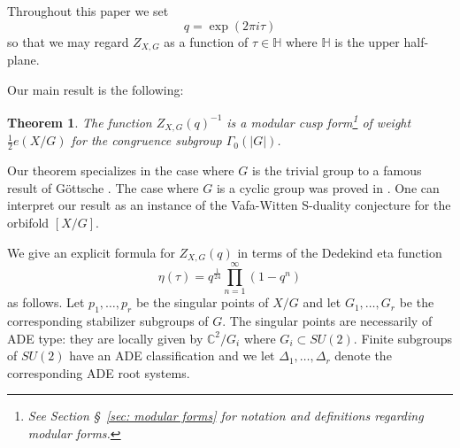 \documentclass{article}
\newtheorem{theorem}{Theorem}[section]
\theoremstyle{definition}
\newcommand{\half}{\frac{1}{2}}
\newcommand{\CC} {{\mathbb C}}          %
\newcommand{\HH}{\mathbb{H}}
\begin{document}
Throughout this paper we set
\[
q=\exp\left(2\pi i \tau  \right)
\]
so that we may regard $Z_{X,G}$ as a function of $\tau \in \HH$ where
$\HH$ is the upper half-plane.

Our main result is the following:

\begin{theorem}
\label{thm:main}
The function $Z_{X,G}(q)^{-1}$ is a modular cusp form\footnote{See
Section \S~\ref{sec: modular forms}  for notation and definitions regarding modular
forms.} of weight $\half e(X/G)$ for the congruence subgroup
$\Gamma_{0}(|G|)$.
\end{theorem}
   

Our theorem specializes in the case where $G$ is the trivial group to
a famous result of G\"ottsche \cite{gottsche1990betti}. The case where
$G$ is a cyclic group was proved in \cite{bryan2018chl}. One can
interpret our result as an instance of the Vafa-Witten S-duality
conjecture for the orbifold $[X/G]$.

\begin{comment}
The partition function $Z_{X,G}(q)$ also has an interpretation in
enumerative geometry: its coefficients count $G$-invariant rational
curves on $X$ (see \S~\ref{subsec: enumerative applications}),
generalizing the famous Yau-Zaslow formula.
\end{comment}



We give an explicit formula for $Z_{X,G}(q)$ in terms of the
Dedekind eta function
\[
\eta (\tau ) = q^{\frac{1}{24}}\prod_{n=1}^{\infty} (1-q^{n})
\]
as follows. Let $p_{1},\dots ,p_{r}$ be the singular points of $X/G$
and let $G_{1},\dots ,G_{r}$ be the corresponding stabilizer subgroups
of $G$. The singular points are necessarily of ADE type: they are
locally given by $\CC^{2}/G_{i}$ where $G_{i}\subset SU(2)$. Finite
subgroups of $SU(2)$ have an ADE classification and we let
$\Delta_{1},\dots ,\Delta_{r}$ denote the corresponding ADE root
systems.
\end{document}
